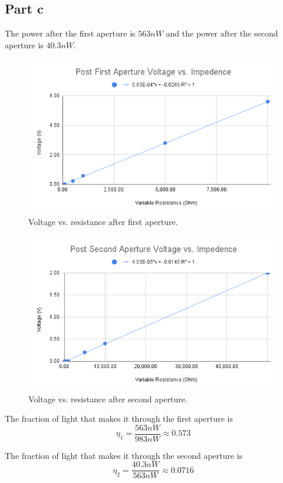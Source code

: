 \subsection*{Part c}
The power after the first aperture is $563nW$ and the power after the second aperture is $40.3nW$.
\begin{figure}[h]
    \centering
    \includegraphics[width=0.75\linewidth]{Resources//180Q//Homework 2/Post First Aperture Voltage vs. Impedence.png}
    \caption{Voltage vs. resistance after first aperture.}
    \label{fig:enter-label}
\end{figure}
\begin{figure}[h]
    \centering
    \includegraphics[width=0.75\linewidth]{Resources//180Q//Homework 2/Post Second Aperture Voltage vs. Impedence.png}
    \caption{Voltage vs. resistance after second aperture.}
    \label{fig:enter-label}
\end{figure}

The fraction of light that makes it through the first aperture is
$$
\eta_1 = \frac{563nW}{983nW} \approx 0.573
$$

The fraction of light that makes it through the second aperture is
$$
\eta_2 = \frac{40.3nW}{563nW} \approx 0.0716
$$

\pagebreak
{}

